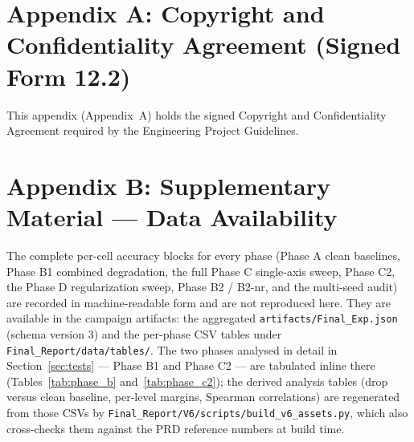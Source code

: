 
\section*{Appendix A: Copyright and Confidentiality Agreement (Signed Form 12.2)}
\label{app:copyright}

This appendix (Appendix~A) holds the signed Copyright and Confidentiality
Agreement required by the Engineering Project Guidelines.

\begin{center}
\end{center}

\section*{Appendix B: Supplementary Material --- Data Availability}
\label{app:tables}

The complete per-cell accuracy blocks for every phase (Phase A clean baselines,
Phase B1 combined degradation, the full Phase C single-axis sweep, Phase C2,
the Phase D regularization sweep, Phase B2 / B2-nr, and the multi-seed audit)
are recorded in machine-readable form and are not reproduced here. They are
available in the campaign artifacts: the aggregated
\texttt{artifacts/Final\_Exp.json} (schema version 3) and the per-phase CSV
tables under \texttt{Final\_Report/data/tables/}. The two phases analysed in
detail in Section~\ref{sec:tests} --- Phase B1 and Phase C2 --- are tabulated
inline there (Tables~\ref{tab:phase_b} and~\ref{tab:phase_c2}); the derived
analysis tables (drop versus clean baseline, per-level margins, Spearman
correlations) are regenerated from those CSVs by
\texttt{Final\_Report/V6/scripts/build\_v6\_assets.py}, which also
cross-checks them against the PRD reference numbers at build time.

